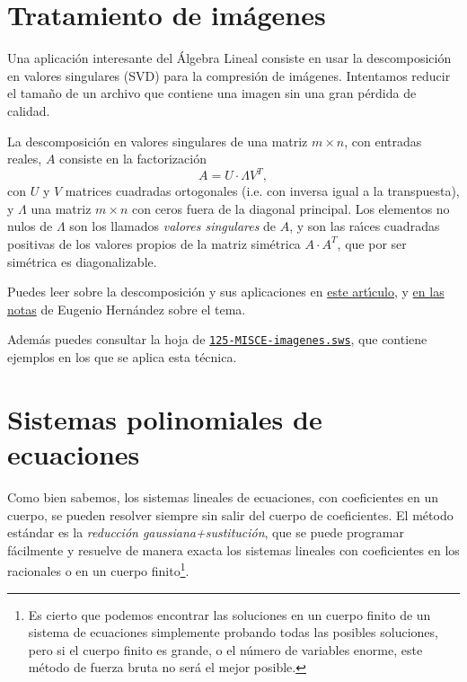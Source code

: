 \section{Tratamiento de im\'agenes}

Una aplicaci\'on interesante del \'Algebra Lineal consiste en usar la 
descomposici\'on en valores singulares (SVD) para la compresi\'on de 
im\'agenes. Intentamos reducir el tama\~no de un archivo que contiene una 
imagen 
sin una gran p\'erdida de calidad. 

La descomposici\'on en valores singulares de una matriz $m\times n$, con 
entradas reales,  $A$ consiste en la factorizaci\'on 
\[A=U\cdot \Lambda V^T,\]
\noindent con $U$ y $V$ matrices cuadradas ortogonales (i.e. con inversa igual 
a la transpuesta), y $\Lambda$ una matriz $m\times n$ con ceros fuera de la 
diagonal principal.  Los elementos no nulos de $\Lambda$ son los llamados 
{\itshape valores singulares} de $A$, y son las ra\'{\i}ces cuadradas positivas 
de los valores propios de la matriz sim\'etrica $A\cdot A^T$, que por ser 
sim\'etrica es diagonalizable. 

Puedes leer sobre la descomposici\'on y sus aplicaciones en
\href{http://150.244.21.37/PDFs/MISCE/SVD2.pdf}{este art\'{\i}culo}, y 
\href{http://150.244.21.37/PDFs/MISCE/SVD1.pdf}{en las notas} de Eugenio Hern\'andez sobre el 
tema.  


Adem\'as puedes consultar la
hoja de {\sage}
\href{http://sage.mat.uam.es:8888/home/pub/??/}{\tt 125-MISCE-imagenes.sws}, 
que contiene ejemplos en los que se aplica esta t\'ecnica. 




\section{Sistemas polinomiales de ecuaciones}
Como bien sabemos, los sistemas lineales de ecuaciones, con coeficientes en un 
cuerpo, se pueden resolver siempre sin salir del cuerpo de coeficientes. El 
m\'etodo est\'andar es la {\itshape reducci\'on gaussiana+sustituci\'on}, que 
se puede programar f\'acilmente y resuelve de manera exacta los sistemas 
lineales con coeficientes en los racionales o en un cuerpo finito\footnote{Es 
cierto que podemos encontrar las soluciones en un cuerpo finito de  un sistema 
de ecuaciones simplemente probando todas las posibles soluciones, pero si el 
cuerpo finito es grande, o el n\'umero de variables enorme, este m\'etodo de 
fuerza bruta no ser\'a el mejor posible.}.

